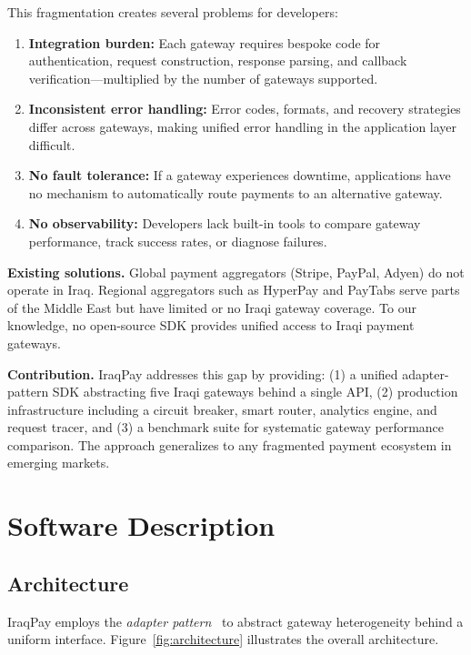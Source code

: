 \documentclass[preprint,12pt]{elsarticle}
\begin{document}
This fragmentation creates several problems for developers:
\begin{enumerate}
\item \textbf{Integration burden:} Each gateway requires bespoke code for authentication, request construction, response parsing, and callback verification---multiplied by the number of gateways supported.
\item \textbf{Inconsistent error handling:} Error codes, formats, and recovery strategies differ across gateways, making unified error handling in the application layer difficult.
\item \textbf{No fault tolerance:} If a gateway experiences downtime, applications have no mechanism to automatically route payments to an alternative gateway.
\item \textbf{No observability:} Developers lack built-in tools to compare gateway performance, track success rates, or diagnose failures.
\end{enumerate}

\textbf{Existing solutions.} Global payment aggregators (Stripe, PayPal, Adyen) do not operate in Iraq. Regional aggregators such as HyperPay and PayTabs serve parts of the Middle East but have limited or no Iraqi gateway coverage. To our knowledge, no open-source SDK provides unified access to Iraqi payment gateways.

\textbf{Contribution.} IraqPay addresses this gap by providing: (1) a unified adapter-pattern SDK abstracting five Iraqi gateways behind a single API, (2) production infrastructure including a circuit breaker, smart router, analytics engine, and request tracer, and (3) a benchmark suite for systematic gateway performance comparison. The approach generalizes to any fragmented payment ecosystem in emerging markets.

\section{Software Description}
\label{sec:description}

\subsection{Architecture}

IraqPay employs the \emph{adapter pattern}~\cite{gamma1994design} to abstract gateway heterogeneity behind a uniform interface. Figure~\ref{fig:architecture} illustrates the overall architecture.
\end{document}

